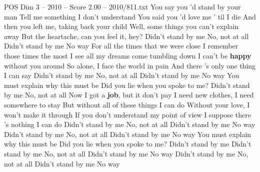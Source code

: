 \begin{textsample}{POS Dim 3 – 2010 – Score 2.00 – 2010/811.txt}  \label{ex:f3_pos_025}
You say you 'd stand by your man Tell me something I don't understand You said you 'd love me ' til I die And then you left me, taking back your child Well, some things you can't explain away But the heartache, can you feel it, hey?
Didn't stand by me No, not at all Didn't stand by me No way For all the times that we were close I remember those times the most I see all my dreams come tumbling down I can't be \textbf{happy} without you around So alone, I face the world in pain And there 's only one thing I can say Didn't stand by me No, not at all Didn't stand by me No way You must explain why this must be Did you lie when you spoke to me?
Didn't stand by me No, not at all Now I got a \textbf{job}, but it don't pay I need new clothes, I need somewhere to stay But without all of these things I can do Without your love, I won't make it through If you don't understand my point of view I suppose there 's nothing I can do Didn't stand by me No, not at all Didn't stand by me No way Didn't stand by me No, not at all Didn't stand by me No way You must explain why this must be Did you lie when you spoke to me?
Didn't stand by me Didn't stand by me No, not at all Didn't stand by me No way Didn't stand by me No, not at all Didn't stand by me No way

\end{textsample}
